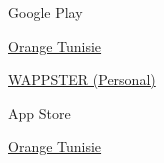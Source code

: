 

\begin{cventries}

  \cventrylight
    {Google Play} 
    {
      \begin{cvitems} %
        \item {\href{https://play.google.com/store/apps/developer?id=Orange+Tunisie}{Orange Tunisie}}
        \item { \href{https://play.google.com/store/apps/dev?id=7822449653070237293}{WAPPSTER (Personal)}}
      \end{cvitems}
    }

	\cventrylight
		{App Store} 
		{
			\begin{cvitems} %
				\item {\href{https://itunes.apple.com/us/developer/id923409243}{Orange Tunisie}}
			\end{cvitems}
		}

\end{cventries}
